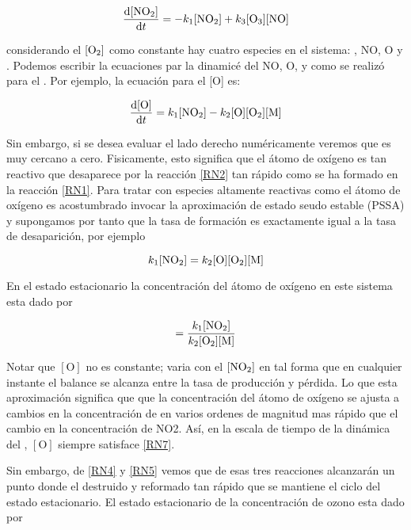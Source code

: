 \begin{equation}
\frac{\mathrm{d}[\ce{NO2}]}{\mathrm{d}t}=-k_1[\ce{NO2}]+k_3[\ce{O3}][\ce{NO}]
\label{RN4}
\end{equation}

considerando el $[\ce{O2}]$ como constante hay cuatro especies en el sistema: , NO, O y . Podemos escribir la ecuaciones par la dinamicé del NO, O, y  como se realizó para el . Por ejemplo, la ecuación para el  [O] es:

\begin{equation}
\frac{\mathrm{d}[\ce{O}]}{\mathrm{d}t}=k_1[\ce{NO2}]-k_2[\ce{O}][\ce{O2}][\ce{M}]
\label{RN5}
\end{equation}

Sin embargo, si se desea evaluar el lado derecho numéricamente veremos que es muy cercano a cero. Fisicamente, esto significa que el átomo de oxígeno es tan reactivo que desaparece por la reacción \ref{RN2}  tan rápido como se ha formado en la reacción \ref{RN1}. Para tratar con especies altamente reactivas como el átomo de oxígeno es acostumbrado invocar la aproximación de estado seudo estable (PSSA) y supongamos por tanto que la tasa de formación es exactamente igual a la tasa de desaparición, por ejemplo

\begin{equation*}
k_1[\ce{NO2}]=k_2[\ce{O}][\ce{O2}][\ce{M}]
\end{equation*}

En el estado estacionario la concentración del átomo de oxígeno en este sistema esta dado por

\begin{equation}
[\ce{O}]=\frac{k_1[\ce{NO2}]}{k_2[\ce{O2}][\ce{M}]}
\label{RN7}
\end{equation}

Notar que $[\textrm{O}]$ no es constante; varia con el $[\ce{NO2}]$ en tal forma que en cualquier instante el balance se alcanza entre la tasa de producción y pérdida. Lo que esta aproximación significa que que la concentración del átomo de oxígeno se ajusta a cambios en la concentración de  en varios ordenes de magnitud mas rápido que el cambio en la concentración de NO2. Así, en la escala de tiempo de la dinámica del , $[\textrm{O}]$ siempre satisface \ref{RN7}.

Sin embargo, de \ref{RN4} y \ref{RN5} vemos que de esas tres reacciones alcanzarán un punto donde el  destruido y reformado tan rápido que se mantiene el ciclo del estado estacionario. El estado estacionario de la concentración de ozono esta dado por

